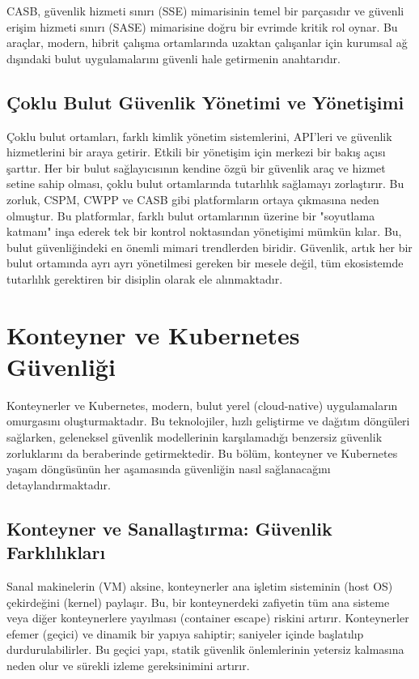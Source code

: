 CASB, güvenlik hizmeti sınırı (SSE) mimarisinin temel bir parçasıdır ve güvenli erişim hizmeti sınırı (SASE) mimarisine doğru bir evrimde kritik rol oynar. Bu araçlar, modern, hibrit çalışma ortamlarında uzaktan çalışanlar için kurumsal ağ dışındaki bulut uygulamalarını güvenli hale getirmenin anahtarıdır.

\subsection{Çoklu Bulut Güvenlik Yönetimi ve Yönetişimi}

Çoklu bulut ortamları, farklı kimlik yönetim sistemlerini, API'leri ve güvenlik hizmetlerini bir araya getirir. Etkili bir yönetişim için merkezi bir bakış açısı şarttır. Her bir bulut sağlayıcısının kendine özgü bir güvenlik araç ve hizmet setine sahip olması, çoklu bulut ortamlarında tutarlılık sağlamayı zorlaştırır. Bu zorluk, CSPM, CWPP ve CASB gibi platformların ortaya çıkmasına neden olmuştur. Bu platformlar, farklı bulut ortamlarının üzerine bir "soyutlama katmanı" inşa ederek tek bir kontrol noktasından yönetişimi mümkün kılar. Bu, bulut güvenliğindeki en önemli mimari trendlerden biridir. Güvenlik, artık her bir bulut ortamında ayrı ayrı yönetilmesi gereken bir mesele değil, tüm ekosistemde tutarlılık gerektiren bir disiplin olarak ele alınmaktadır.

\section{Konteyner ve Kubernetes Güvenliği}

Konteynerler ve Kubernetes, modern, bulut yerel (cloud-native) uygulamaların omurgasını oluşturmaktadır. Bu teknolojiler, hızlı geliştirme ve dağıtım döngüleri sağlarken, geleneksel güvenlik modellerinin karşılamadığı benzersiz güvenlik zorluklarını da beraberinde getirmektedir. Bu bölüm, konteyner ve Kubernetes yaşam döngüsünün her aşamasında güvenliğin nasıl sağlanacağını detaylandırmaktadır.

\subsection{Konteyner ve Sanallaştırma: Güvenlik Farklılıkları}

Sanal makinelerin (VM) aksine, konteynerler ana işletim sisteminin (host OS) çekirdeğini (kernel) paylaşır. Bu, bir konteynerdeki zafiyetin tüm ana sisteme veya diğer konteynerlere yayılması (container escape) riskini artırır. Konteynerler efemer (geçici) ve dinamik bir yapıya sahiptir; saniyeler içinde başlatılıp durdurulabilirler. Bu geçici yapı, statik güvenlik önlemlerinin yetersiz kalmasına neden olur ve sürekli izleme gereksinimini artırır.

